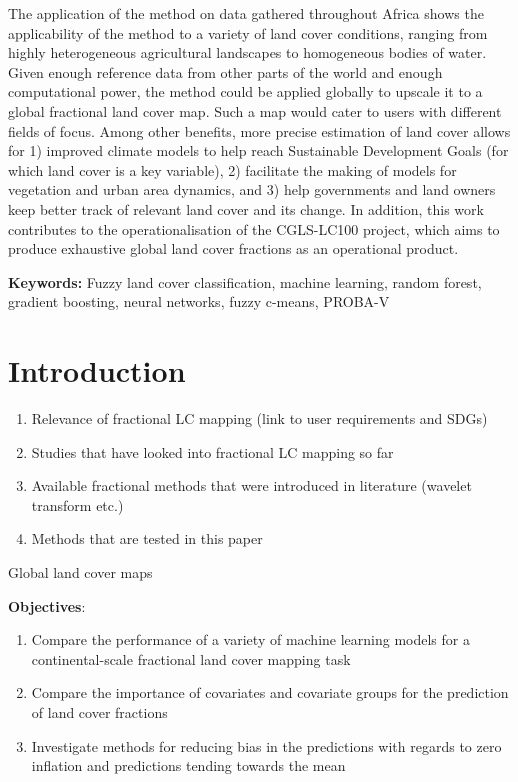 \documentclass[a4paper,10pt]{article}
\newcommand{\minisection}[1]{\medskip \textbf{#1:}}
\begin{document}
{The application of the method on data gathered throughout Africa shows the applicability of the method to a variety of land cover conditions, ranging from highly heterogeneous agricultural landscapes to homogeneous bodies of water. Given enough reference data from other parts of the world and enough computational power, the method could be applied globally to upscale it to a global fractional land cover map. Such a map would cater to users with different fields of focus. Among other benefits, more precise estimation of land cover allows for 1) improved climate models to help reach Sustainable Development Goals (for which land cover is a key variable), 2) facilitate the making of models for vegetation and urban area dynamics, and 3) help governments and land owners keep better track of relevant land cover and its change. In addition, this work contributes to the operationalisation of the CGLS-LC100 project, which aims to produce exhaustive global land cover fractions as an operational product.

\minisection{Keywords} Fuzzy land cover classification, machine learning, random forest, gradient boosting, neural networks, fuzzy c-means, PROBA-V
}

\section{Introduction}

\begin{enumerate}
 \item Relevance of fractional LC mapping (link to user requirements and SDGs)
 \item Studies that have looked into fractional LC mapping so far
 \item Available fractional methods that were introduced in literature (wavelet transform etc.)
 \item Methods that are tested in this paper
\end{enumerate}

Global land cover maps 

\textbf{Objectives}:

\begin{enumerate}
 \item Compare the performance of a variety of machine learning models for a continental-scale fractional land cover mapping task
 \item Compare the importance of covariates and covariate groups for the prediction of land cover fractions
 \item Investigate methods for reducing bias in the predictions with regards to zero inflation and predictions tending towards the mean
\end{enumerate}
\end{document}
